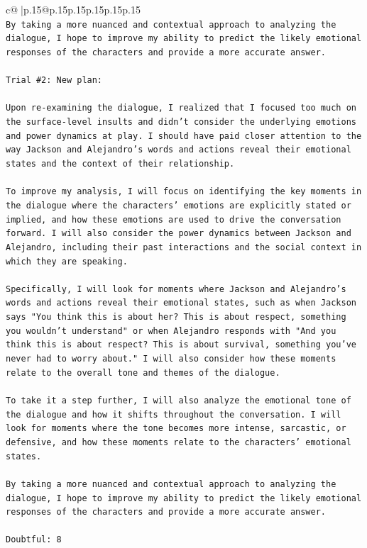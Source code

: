 \documentclass{article}
\begin{document}
{\begin{supertabular}{c@{$\;$}|p{.15\linewidth}@{}p{.15\linewidth}p{.15\linewidth}p{.15\linewidth}p{.15\linewidth}p{.15\linewidth}}
{{{\\ 
\texttt{By taking a more nuanced and contextual approach to analyzing the dialogue, I hope to improve my ability to predict the likely emotional responses of the characters and provide a more accurate answer.} \\
\\ 
\texttt{Trial \#2: New plan: } \\
\\ 
\texttt{Upon re{-}examining the dialogue, I realized that I focused too much on the surface{-}level insults and didn't consider the underlying emotions and power dynamics at play. I should have paid closer attention to the way Jackson and Alejandro's words and actions reveal their emotional states and the context of their relationship.} \\
\\ 
\texttt{To improve my analysis, I will focus on identifying the key moments in the dialogue where the characters' emotions are explicitly stated or implied, and how these emotions are used to drive the conversation forward. I will also consider the power dynamics between Jackson and Alejandro, including their past interactions and the social context in which they are speaking.} \\
\\ 
\texttt{Specifically, I will look for moments where Jackson and Alejandro's words and actions reveal their emotional states, such as when Jackson says "You think this is about her? This is about respect, something you wouldn't understand" or when Alejandro responds with "And you think this is about respect? This is about survival, something you've never had to worry about." I will also consider how these moments relate to the overall tone and themes of the dialogue.} \\
\\ 
\texttt{To take it a step further, I will also analyze the emotional tone of the dialogue and how it shifts throughout the conversation. I will look for moments where the tone becomes more intense, sarcastic, or defensive, and how these moments relate to the characters' emotional states.} \\
\\ 
\texttt{By taking a more nuanced and contextual approach to analyzing the dialogue, I hope to improve my ability to predict the likely emotional responses of the characters and provide a more accurate answer.} \\
\\ 
\texttt{Doubtful: 8} \\
}}}
\end{supertabular}}
\end{document}

